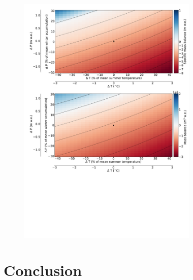 \documentclass[annals,review,oneside]{igs}
\begin{document}

\begin{figure}[H]
\centering
\includegraphics[width=86mm,trim=0cm 0cm 0cm 0cm, clip=true]
{SMB_S.pdf}
\caption{}
\label{SMB}
\end{figure}

\section{Conclusion}



\end{document}
